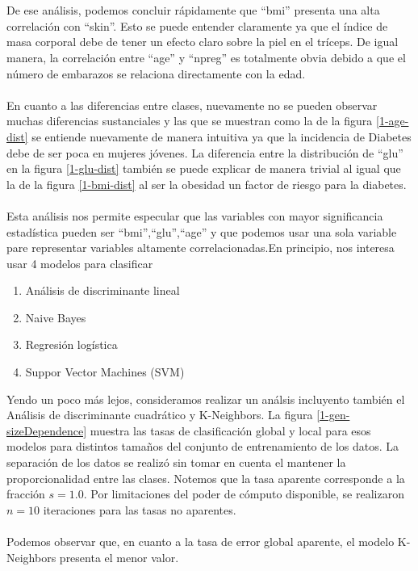 \documentclass[11pt]{article}
\begin{document}
\\
\\De ese análisis, podemos concluir rápidamente que ``bmi'' presenta una alta correlación con ``skin''. Esto se puede entender claramente ya que el índice de masa corporal debe de tener un efecto claro sobre la piel en el tríceps. De igual manera, la correlación entre ``age'' y ``npreg'' es totalmente obvia debido a que el número de embarazos se relaciona directamente con la edad.
\\
\\En cuanto a las diferencias entre clases, nuevamente no se pueden observar muchas diferencias sustanciales y las que se muestran como la de la figura \ref{1-age-dist} se entiende nuevamente de manera intuitiva ya que la incidencia de Diabetes debe de ser poca en mujeres jóvenes. La diferencia entre la distribución de ``glu'' en la figura \ref{1-glu-dist} también se puede explicar de manera trivial al igual que la de la figura \ref{1-bmi-dist} al ser la obesidad un factor de riesgo para la diabetes.
\\
\\Esta análisis nos permite especular que las variables con mayor significancia estadística pueden ser ``bmi'',``glu'',``age'' y que podemos usar una sola variable pare representar variables altamente correlacionadas.En principio, nos interesa usar 4 modelos para clasificar
\begin{enumerate}[label = \alph*)]
    \item Análisis de discriminante lineal
    \item Naive Bayes
    \item Regresión logística
    \item Suppor Vector Machines (SVM)
\end{enumerate}
Yendo un poco más lejos, consideramos realizar un análsis incluyento también el Análisis de discriminante cuadrático y K-Neighbors. La figura \ref{1-gen-sizeDependence} muestra las tasas de clasificación global y local para esos modelos para distintos tamaños del conjunto de entrenamiento de los datos. La separación de los datos se realizó sin tomar en cuenta el mantener la proporcionalidad entre las clases. Notemos que la tasa aparente corresponde a la fracción $s=1.0$. Por limitaciones del poder de cómputo disponible, se realizaron $n=10$ iteraciones para las tasas no aparentes.
\\
\\ Podemos observar que, en cuanto a la tasa de error global aparente, el modelo K-Neighbors presenta el menor valor. 
\end{document}
